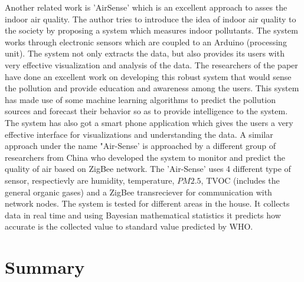 Another related work is 'AirSense'\cite{Fang2016} which is an excellent approach to asses the indoor air quality. The author tries to introduce the idea of indoor air quality to the society by proposing a system which measures indoor pollutants. The system works through electronic sensors which are coupled to an Arduino (processing unit). The system not only extracts the data, but also provides its users with very effective visualization and analysis of the data. The researchers of the paper have done an excellent work on developing this robust system that would sense the pollution and provide education and awareness among the users. This system has made use of some machine learning algorithms to predict the pollution sources and forecast their behavior so as to provide intelligence to the system. 
The system has also got a smart phone application which gives the users a very effective interface for visualizations and understanding the data.
A similar approach under the name "Air-Sense' \cite{Liu2017} is approached by a different group of researchers from China who developed the system to monitor and predict the quality of air based on ZigBee network. The 'Air-Sense' uses 4 different type of sensor, respectievly are humidity, temperature, $PM2.5$, TVOC (includes the general organic gases) and a ZigBee transreciever for communication with network nodes. The system is tested for different areas in the house. It collects data in real time and using Bayesian mathematical statistics it predicts how accurate is the collected value to standard value predicted by WHO. 


 \section{Summary}